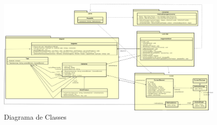 \begin{figure}[!htb]
	\caption{Diagrama de Classes}\label{figura:diagramaclasses}
	\begin{center}
		\includegraphics[scale=0.2]{img/ferramenta_diagrama_classes}
	\end{center}
\end{figure}


